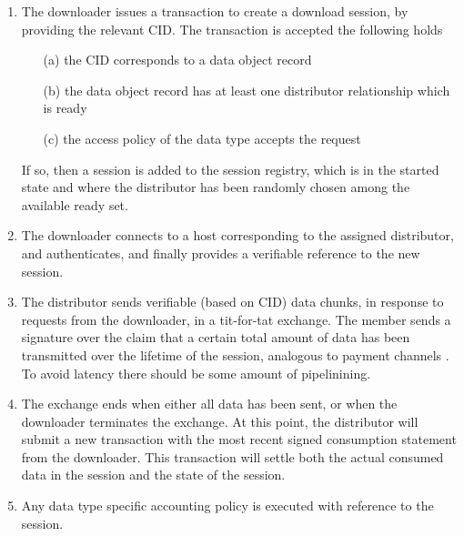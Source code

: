 \documentclass{article}
\begin{document}
\begin{enumerate}

\item
The downloader issues a transaction to create a download session, by providing the relevant CID. The transaction is accepted the following holds

      \begin{itemize}

      \item[(a)] the CID corresponds to a data object record

      \item[(b)] the data object record has at least one distributor relationship which is ready

      \item[(c)] the access policy of the data type accepts the request

      \end{itemize}

If so, then a session is added to the session registry, which is in the started state and where the distributor has been randomly chosen among the available ready set.

\item
The downloader connects to a host corresponding to the assigned distributor, and authenticates, and finally provides a verifiable reference to the new session.

\item
The distributor sends verifiable (based on CID) data chunks, in response to requests from the downloader, in a tit-for-tat exchange. The member sends a signature over the claim that a certain total amount of data has been transmitted over the lifetime of the session, analogous to payment channels \cite{payment_channels}. To avoid latency there should be some amount of pipelinining.

\item
The exchange ends when either all data has been sent, or when the downloader terminates the exchange. At this point, the distributor will submit a new transaction with the most recent signed consumption statement from the downloader. This transaction will settle both the actual consumed data in the session and the state of the session.

\item
Any data type specific accounting policy is executed with reference to the session.

\end{enumerate}
\end{document}
